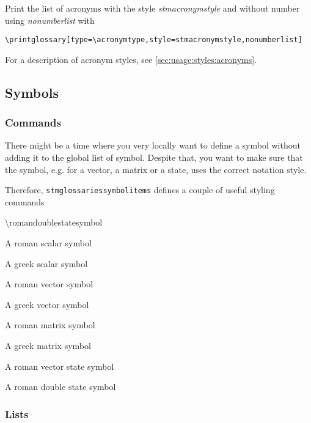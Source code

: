 \documentclass{scrartcl}
\begin{document}
Print the list of acronyms with the style \textit{stmacronymstyle} and without number using \textit{nonumberlist} with

\begin{verbatim}
\printglossary[type=\acronymtype,style=stmacronymstyle,nonumberlist]
\end{verbatim}

For a description of acronym styles, see \autoref{sec:usage:styles:acronyms}.

\subsection{Symbols}
\label{sec:usage:document:symbols}

\subsubsection{Commands}
\label{sec:usage:document:symbols:commands}

There might be a time where you very locally want to define a symbol without adding it to the global list of symbol. Despite that, you want to make sure that the symbol, e.g. for a vector, a matrix or a state, uses the correct notation style.

Therefore, \texttt{stmglossariessymbolitems} defines a couple of useful styling commands

\begin{labeling}{\textbackslash romandoublestatesymbol}
\item [\textbackslash romanscalarsymbol] A roman scalar symbol
\item [\textbackslash greekscalarsymbol] A greek scalar symbol
\item [\textbackslash romanvectorsymbol] A roman vector symbol
\item [\textbackslash greekvectorsymbol] A greek vector symbol
\item [\textbackslash romanmatrixsymbol] A roman matrix symbol
\item [\textbackslash scalarstatesymbol] A greek matrix symbol
\item [\textbackslash romanvectorstatesymbol] A roman vector state symbol
\item [\textbackslash romandoublestatesymbol] A roman double state symbol
\end{labeling}

\subsubsection{Lists}
\label{sec:usage:symbols:document:lists}
\end{document}
